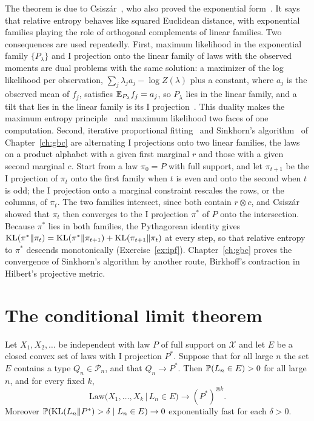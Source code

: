 The theorem is due to Csisz\'ar~\cite[Theorem~2.2]{csiszar1975}, who also proved the exponential form~\cite[Theorem~3.1]{csiszar1975}. It says that relative entropy behaves like squared Euclidean distance, with exponential families playing the role of orthogonal complements of linear families. Two consequences are used repeatedly. First, maximum likelihood in the exponential family $\{P_\lambda\}$ and I projection onto the linear family of laws with the observed moments are dual problems with the same solution: a maximizer of the log likelihood per observation, $\sum_j\lambda_ja_j-\log Z(\lambda)$ plus a constant, where $a_j$ is the observed mean of $f_j$, satisfies $\E_{P_\lambda}f_j = a_j$, so $P_\lambda$ lies in the linear family, and a tilt that lies in the linear family is its I projection~\cite[Theorem~3.1]{csiszar1975}. This duality makes the maximum entropy principle~\cite{jaynes1957} and maximum likelihood two faces of one computation. Second, iterative proportional fitting~\cite{demingstephan1940} and Sinkhorn's algorithm~\cite{sinkhorn1964} of Chapter~\ref{ch:gbc} are alternating I projections onto two linear families, the laws on a product alphabet with a given first marginal $r$ and those with a given second marginal $c$. Start from a law $\pi_0 = P$ with full support, and let $\pi_{t+1}$ be the I projection of $\pi_t$ onto the first family when $t$ is even and onto the second when $t$ is odd; the I projection onto a marginal constraint rescales the rows, or the columns, of $\pi_t$. The two families intersect, since both contain $r\otimes c$, and Csisz\'ar~\cite[Theorem~3.2]{csiszar1975} showed that $\pi_t$ then converges to the I projection $\pi^*$ of $P$ onto the intersection. Because $\pi^*$ lies in both families, the Pythagorean identity gives $\KL(\pi^*\|\pi_t) = \KL(\pi^*\|\pi_{t+1})+\KL(\pi_{t+1}\|\pi_t)$ at every step, so that relative entropy to $\pi^*$ descends monotonically (Exercise~\ref{ex:ipf}). Chapter~\ref{ch:gbc} proves the convergence of Sinkhorn's algorithm by another route, Birkhoff's contraction in Hilbert's projective metric.

\section{The conditional limit theorem}

\begin{theorem}
\label{thm:conditional}
Let $X_1,X_2,\dots$ be independent with law $P$ of full support on $\mathcal{X}$ and let $E$ be a closed convex set of laws with I projection $P^*$. Suppose that for all large $n$ the set $E$ contains a type $Q_n\in\mathcal{P}_n$, and that $Q_n\to P^*$. Then $\P(L_n\in E)>0$ for all large $n$, and for every fixed $k$,
\[
\mathrm{Law}\big(X_1,\dots,X_k\,\big|\,L_n\in E\big)\longrightarrow(P^*)^{\otimes k}.
\]
Moreover $\P(\KL(L_n\|P^*)>\delta\mid L_n\in E)\to0$ exponentially fast for each $\delta>0$.
\end{theorem}

